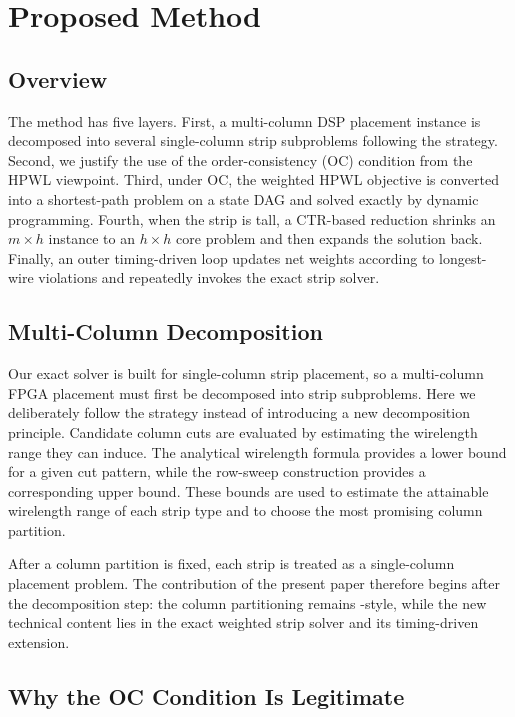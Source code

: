 \section{Proposed Method}
\label{sec:method}

\subsection{Overview}

The method has five layers. First, a multi-column DSP placement instance is decomposed into several single-column strip subproblems following the \rsad strategy. Second, we justify the use of the order-consistency (OC) condition from the HPWL viewpoint. Third, under OC, the weighted HPWL objective is converted into a shortest-path problem on a state DAG and solved exactly by dynamic programming. Fourth, when the strip is tall, a CTR-based reduction shrinks an $m \times h$ instance to an $h \times h$ core problem and then expands the solution back. Finally, an outer timing-driven loop updates net weights according to longest-wire violations and repeatedly invokes the exact strip solver.

\subsection{Multi-Column Decomposition}

Our exact solver is built for single-column strip placement, so a multi-column FPGA placement must first be decomposed into strip subproblems. Here we deliberately follow the \rsad strategy instead of introducing a new decomposition principle. Candidate column cuts are evaluated by estimating the wirelength range they can induce. The \rsad analytical wirelength formula provides a lower bound for a given cut pattern, while the row-sweep construction provides a corresponding upper bound. These bounds are used to estimate the attainable wirelength range of each strip type and to choose the most promising column partition.

After a column partition is fixed, each strip is treated as a single-column placement problem. The contribution of the present paper therefore begins after the decomposition step: the column partitioning remains \rsad-style, while the new technical content lies in the exact weighted strip solver and its timing-driven extension.

\subsection{Why the OC Condition Is Legitimate}


